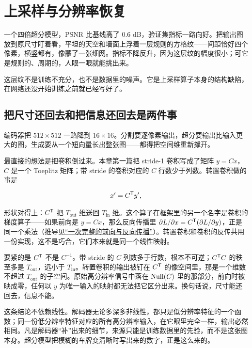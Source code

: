 \section{上采样与分辨率恢复}
\label{sec:14-Deep-Learning/04-Convolutional-Networks/04}

一个四倍超分模型，PSNR 比基线高了 0.6 dB，验证集指标一路向好。把输出图放到原尺寸盯着看，平坦的天空和墙面上浮着一层规则的方格纹——间距恰好四个像素，横竖都有，像蒙了一张细网。指标不降反升，因为这层纹的幅度很小；可它是规则的、周期的，人眼一眼就能挑出来。

这层纹不是训练不充分，也不是数据里的噪声。它是上采样算子本身的结构缺陷，在网络还没开始训练之前就已经写好了。

\subsection{把尺寸还回去和把信息还回去是两件事}

编码器把 \(512\times512\) 一路降到 \(16\times16\)。分割要逐像素输出，超分要输出比输入更大的图，生成要从一个短向量长出整张图——都得把空间维重新撑开。

最直接的想法是把卷积倒过来。本章第一篇把 stride-1 卷积写成了矩阵 \(y = Cx\)，\(C\) 是一个 Toeplitz 矩阵；带 stride 的卷积对应的 \(C\) 行数少于列数。转置卷积做的事是

\[
x' = C^{\mathsf{T}} y',
\]

形状对得上：\(C^{\mathsf{T}}\) 把 \(T_{\mathrm{out}}\) 维送回 \(T_{\mathrm{in}}\) 维。这个算子在框架里的另一个名字是卷积的梯度算子——如果前向是 \(y=Cx\)，那么反向传播里 \(\partial L/\partial x = C^{\mathsf{T}}(\partial L/\partial y)\)，正是同一个乘法（推导见\hyperref[sec:14-Deep-Learning/02-Losses-and-Backpropagation/02]{``一次完整的前向与反向传播''}）。转置卷积和卷积的反传共用一份实现，这不是巧合，它们本来就是同一个线性映射。

要紧的是 \(C^{\mathsf{T}}\) 不是 \(C^{-1}\)。带 stride 的 \(C\) 列数多于行数，根本不可逆；\(C^{\mathsf{T}}C\) 的秩至多是 \(T_{\mathrm{out}}\)，远小于 \(T_{\mathrm{in}}\)。转置卷积的输出被钉在 \(C^{\mathsf{T}}\) 的像空间里，那是一个维数不超过 \(T_{\mathrm{out}}\) 的子空间。原始高分辨率信号中落在 \(\operatorname{Null}(C)\) 里的那部分，前向时被映成零，任何以 \(y\) 为唯一输入的映射都无法把它区分出来。换句话说，尺寸能还回去，信息不能。

这条结论不依赖线性。解码器无论多深多非线性，都只是低分辨率特征的一个函数；同一份低分辨率特征对应的所有高分辨率输入，在它眼里完全一样，输出必然相同。凡是解码器``补''出来的细节，来源只能是训练数据里的先验，而不是这张图本身。超分模型把模糊的车牌变清晰时写出来的数字，正是这么来的。

